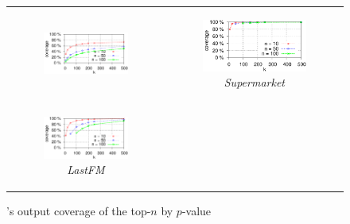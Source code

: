 \begin{figure}
	\centering
  \begin{tabular}{cc}
		\begin{subfigure}[b]{0.48\textwidth}
			\includegraphics{fig/toppi/top-Correlatedcoverage/tickets2013.pdf}
			\caption{\prodassocreceipt}
		\end{subfigure}
  	&
  	\begin{subfigure}[b]{0.48\textwidth}
  		\includegraphics{fig/toppi/top-Correlatedcoverage/supermarket.pdf}
  		\caption{\em Supermarket}
  	\end{subfigure}
    \\
		\begin{subfigure}[b]{0.48\textwidth}
  		\includegraphics{fig/toppi/top-Correlatedcoverage/lastfm.pdf}
  		\caption{\em LastFM}
  	\end{subfigure}
    &
    \begin{minipage}[b]{0.40\linewidth}
    \vspace{-2in}
      \caption{\label{fig:pvalCoverage}
    		\toppi's output coverage of the top-$n$ by $p$-value
    	}
    \end{minipage}
    \\
  \end{tabular}
\end{figure}

